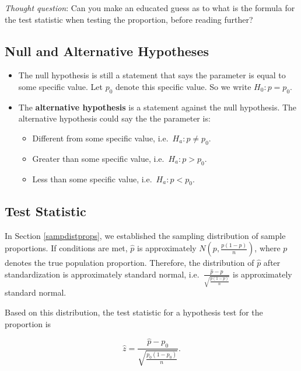 \documentclass[
]{book}
\begin{document}
\emph{Thought question}: Can you make an educated guess as to what is the formula for the test statistic when testing the proportion, before reading further?

\subsection{Null and Alternative Hypotheses}\label{null-and-alternative-hypotheses-1}

\begin{itemize}
\item
  The null hypothesis is still a statement that says the parameter is equal to some specific value. Let \(p_0\) denote this specific value. So we write \(H_0: p = p_0\).
\item
  The \textbf{alternative hypothesis} is a statement against the null hypothesis. The alternative hypothesis could say the the parameter is:

  \begin{itemize}
  \item
    Different from some specific value, i.e.~\(H_a: p \neq p_0\).
  \item
    Greater than some specific value, i.e.~\(H_a: p > p_0\).
  \item
    Less than some specific value, i.e.~\(H_a: p < p_0\).
  \end{itemize}
\end{itemize}

\subsection{Test Statistic}\label{test-statistic-1}

In Section \ref{sampdistprops}, we established the sampling distribution of sample proportions. If conditions are met, \(\hat{p}\) is approximately \(N\left(p, \frac{p(1-p)}{n}\right)\), where \(p\) denotes the true population proportion. Therefore, the distribution of \(\hat{p}\) after standardization is approximately standard normal, i.e.~\(\frac{\hat{p}-p}{\sqrt{\frac{p(1-p)}{n}}}\) is approximately standard normal.

Based on this distribution, the test statistic for a hypothesis test for the proportion is

\begin{equation} 
\hat{z} =  \frac{\hat{p} - p_0}{\sqrt{\frac{p_0(1-p_0)}{n}}} .
\label{eq:9-teststatProp}
\end{equation}
\end{document}
